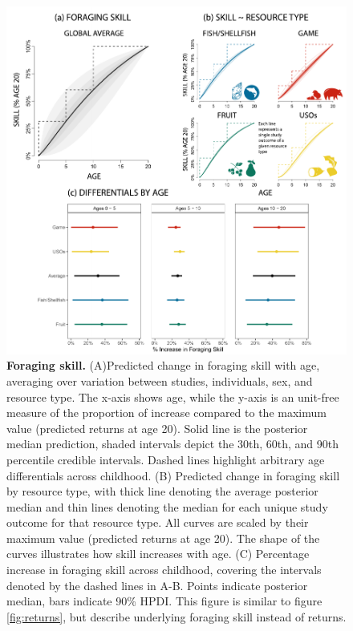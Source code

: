 \begin{figure}[h]
\centering
\includegraphics[width=12cm] {text/images/Figure_S5.pdf}
\renewcommand{\thefigure}{S\arabic{figure}}
\caption{\textbf{Foraging skill.} (A)Predicted change in foraging skill with age, averaging over variation between studies, individuals, sex, and resource type. The x-axis shows age, while the y-axis is an unit-free measure of the proportion of increase compared to the maximum value (predicted returns at age 20). Solid line is the posterior median prediction, shaded intervals depict the 30th, 60th, and 90th percentile credible intervals. Dashed lines highlight arbitrary age differentials across childhood. (B) Predicted change in foraging skill by resource type, with thick line denoting the average posterior median and thin lines denoting the median for each unique study outcome for that resource type. All curves are scaled by their maximum value (predicted returns at age 20). The shape of the curves illustrates how skill increases with age. (C) Percentage increase in foraging skill across childhood, covering the intervals denoted by the dashed lines in A-B. Points indicate posterior median, bars indicate 90\% HPDI. This figure is similar to figure \ref{fig:returns}, but describe underlying foraging skill instead of returns.}
\label{fig:skill}
\end{figure}

